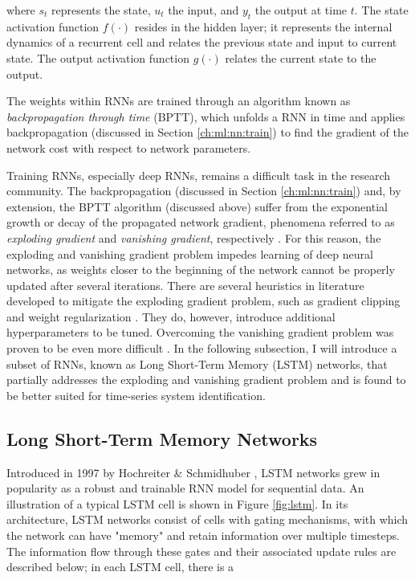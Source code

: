 where $s_t$ represents the state, $u_t$ the input, and $y_t$ the output at time $t$. The state activation function $f(\cdot )$ resides in the hidden layer; it represents the internal dynamics of a recurrent cell and relates the previous state and input to current state. The output activation function $g(\cdot )$ relates the current state to the output. 

The weights within RNNs are trained through an algorithm known as \emph{backpropagation through time} (BPTT), which unfolds a RNN in time and applies backpropagation (discussed in Section \ref{ch:ml:nn:train}) to find the gradient of the network cost with respect to network parameters. 


Training RNNs, especially deep RNNs, remains a difficult task in the research community. The backpropagation (discussed in Section \ref{ch:ml:nn:train}) and, by extension, the BPTT algorithm (discussed above) suffer from the exponential growth or decay of the propagated network gradient, phenomena referred to as \emph{exploding gradient} and \emph{vanishing gradient}, respectively \cite{gradient}. 
For this reason, the exploding and vanishing gradient problem impedes learning of deep neural networks, as weights closer to the beginning of the network cannot be properly updated after several iterations. There are several heuristics in literature developed to mitigate the exploding gradient problem, such as gradient clipping and weight regularization \cite{gradient}. They do, however, introduce additional hyperparameters to be tuned. Overcoming the vanishing gradient problem was proven to be even more difficult \cite{vanish_grad_difficult}. In the following subsection, I will introduce a subset of RNNs, known as Long Short-Term Memory (LSTM) networks, that partially addresses the exploding and vanishing gradient problem and is found to be better suited for time-series system identification.

\subsection{Long Short-Term Memory Networks} \label{ch:ml:rnn:lstm}

Introduced in 1997 by Hochreiter \& Schmidhuber \cite{lstm_hochreiter}, LSTM networks grew in popularity as a robust and trainable RNN model for sequential data. An illustration of a typical LSTM cell is shown in Figure \ref{fig:lstm}. In its architecture, LSTM networks consist of cells with gating mechanisms, with which the network can have "memory" and retain information over multiple timesteps. The information flow through these gates and their associated update rules are described below; in each LSTM cell, there is a

